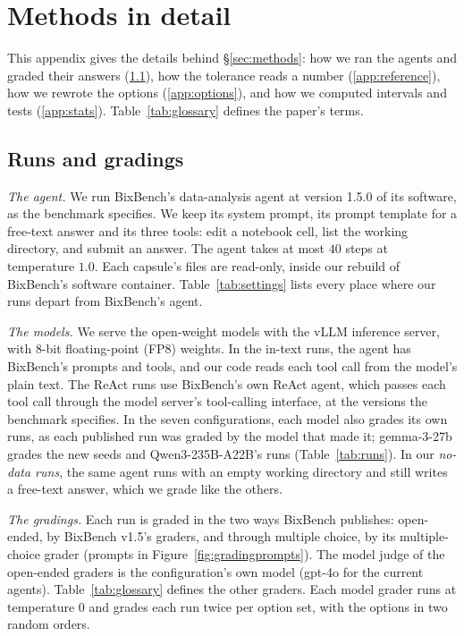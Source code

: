\documentclass{article}
\begin{document}



\clearpage
\appendix

\section{Methods in detail}
\label{app:methods}

This appendix gives the details behind \S\ref{sec:methods}: how we ran the agents and graded their answers (\ref{app:withdata}), how the tolerance reads a number
(\ref{app:reference}), how we rewrote the options (\ref{app:options}), and how we computed intervals and tests
(\ref{app:stats}). Table~\ref{tab:glossary} defines the paper's terms.

\subsection{Runs and gradings}
\label{app:withdata}

\emph{The agent.} We run BixBench's data-analysis agent at version 1.5.0 of its software, as the benchmark specifies.
We keep its system prompt, its prompt template for a free-text answer and its three tools: edit a notebook cell, list
the working directory, and submit an answer. The agent takes at most $40$ steps at temperature $1.0$. Each capsule's
files are read-only, inside our rebuild of BixBench's software container. Table~\ref{tab:settings} lists every place
where our runs depart from BixBench's agent.

\emph{The models.} We serve the open-weight models with the vLLM inference server, with 8-bit floating-point (FP8)
weights. In the in-text runs, the agent has BixBench's prompts and tools, and our code reads each tool call from the
model's plain text. The ReAct runs use BixBench's own ReAct agent, which passes each tool call through the model
server's tool-calling interface, at the versions the benchmark specifies. In the seven configurations, each model
also grades its own runs, as each published run was graded by the model that made it; gemma-3-27b grades the new
seeds and Qwen3-235B-A22B's runs (Table~\ref{tab:runs}). In our \emph{no-data runs}, the same agent runs with an
empty working directory and still writes a free-text answer, which we grade like the others.

\emph{The gradings.} Each run is graded in the two ways BixBench publishes: open-ended, by BixBench v1.5's graders,
and through multiple choice, by its multiple-choice grader (prompts in Figure~\ref{fig:gradingprompts}). The model
judge of the open-ended graders is the configuration's own model (gpt-4o for the current agents).
Table~\ref{tab:glossary} defines the other graders. Each model grader runs at temperature $0$ and grades each run
twice per option set, with the options in two random orders.
\end{document}
